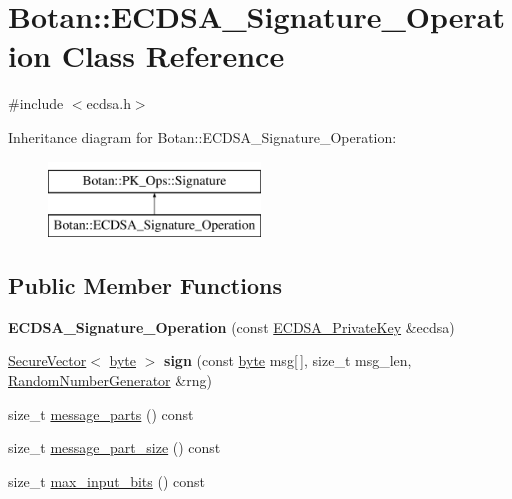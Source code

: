 \hypertarget{classBotan_1_1ECDSA__Signature__Operation}{\section{Botan\-:\-:E\-C\-D\-S\-A\-\_\-\-Signature\-\_\-\-Operation Class Reference}
\label{classBotan_1_1ECDSA__Signature__Operation}
}


{\ttfamily \#include $<$ecdsa.\-h$>$}

Inheritance diagram for Botan\-:\-:E\-C\-D\-S\-A\-\_\-\-Signature\-\_\-\-Operation\-:\begin{figure}[H]
\begin{center}
\leavevmode
\includegraphics[height=2.000000cm]{classBotan_1_1ECDSA__Signature__Operation}
\end{center}
\end{figure}
\subsection*{Public Member Functions}
\begin{DoxyCompactItemize}
\item 
\hypertarget{classBotan_1_1ECDSA__Signature__Operation_af66f09dee2312cd9923ea6752bb38e3b}{{\bfseries E\-C\-D\-S\-A\-\_\-\-Signature\-\_\-\-Operation} (const \hyperlink{classBotan_1_1ECDSA__PrivateKey}{E\-C\-D\-S\-A\-\_\-\-Private\-Key} \&ecdsa)}\label{classBotan_1_1ECDSA__Signature__Operation_af66f09dee2312cd9923ea6752bb38e3b}

\item 
\hypertarget{classBotan_1_1ECDSA__Signature__Operation_a21ff6d9a0dfbc5505d67a5da458e5a15}{\hyperlink{classBotan_1_1SecureVector}{Secure\-Vector}$<$ \hyperlink{namespaceBotan_a7d793989d801281df48c6b19616b8b84}{byte} $>$ {\bfseries sign} (const \hyperlink{namespaceBotan_a7d793989d801281df48c6b19616b8b84}{byte} msg\mbox{[}$\,$\mbox{]}, size\-\_\-t msg\-\_\-len, \hyperlink{classBotan_1_1RandomNumberGenerator}{Random\-Number\-Generator} \&rng)}\label{classBotan_1_1ECDSA__Signature__Operation_a21ff6d9a0dfbc5505d67a5da458e5a15}

\item 
size\-\_\-t \hyperlink{classBotan_1_1ECDSA__Signature__Operation_a1a43fa9351b6050bd536514544f87399}{message\-\_\-parts} () const 
\item 
size\-\_\-t \hyperlink{classBotan_1_1ECDSA__Signature__Operation_a0ac9d49979a460fff458f9b9ee96ab13}{message\-\_\-part\-\_\-size} () const 
\item 
size\-\_\-t \hyperlink{classBotan_1_1ECDSA__Signature__Operation_ad829c871989c15150aec46c8ab9c03be}{max\-\_\-input\-\_\-bits} () const 
\end{DoxyCompactItemize}


